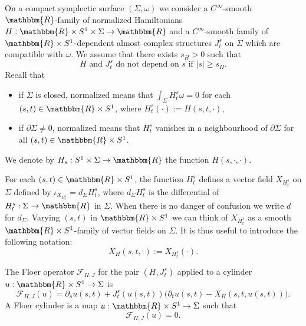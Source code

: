 \documentclass[AHL,Unicode,longabstracts,published]{cedram}
\newcommand{\R}{\mathbbm{R}}
\newcommand{\clF}{\mathcal{F}}
\begin{document}
On a compact symplectic surface $(\Sigma,\omega)$ we consider a $C^\infty$-smooth $\R$-family of normalized Hamiltonians $H:\R \times S^1 \times \Sigma \to \R$ and a $C^\infty$-smooth family of $\R \times S^1$-dependent almost complex structures $J^s_t$ on $\Sigma$ which are compatible with $\omega$. We assume that there exists $s_H>0$ such that
\begin{equation}\label{eq:Hasymp}
H \text{ and } J^s_t \text{ do not depend on } s \text{ if } |s| \geq s_H.
\end{equation}
Recall that
\begin{itemize}
\item if $\Sigma$ is closed, normalized means that $\int_\Sigma H^s_t\omega=0$ for each $(s,t) \in \R \times S^1$, where $H^s_t(\cdot):= H(s,t,\cdot)$,
\item if $\partial \Sigma \neq 0$, normalized means that $H^s_t$ vanishes in a neighbourhood of $\partial \Sigma $ for all $(s,t) \in \R \times S^1$.
\end{itemize}
We denote by $H_s:S^1 \times \Sigma \to \R$ the function $H(s,\cdot,\cdot)$.



For each $(s,t) \in \R \times S^1$, the function $ H^s_t$ defines a vector field $X_{H^s_t}$ on $\Sigma$ defined by $\iota_{X_{H^s_t}}= d_\Sigma H^s_t$, where $d_\Sigma {H^s_t}$ is the differential of $ H^s_t : \Sigma \to \R$ in $\Sigma$. When there is no danger of confusion we write $d$ for $d_\Sigma$. Varying $(s,t)$ in $\R \times S^1$ we can think of $X_{H^s_t}$ as a smooth $\R \times S^1$-family of vector fields on $\Sigma$. It is thus useful to introduce the following notation:
\[
X_H(s,t,\cdot) :=X_{H^s_t}(\cdot).
\]

The Floer operator $\clF_{H,J}$ for the pair $(H,J^s_t)$ applied to a cylinder $u: \R \times S^1 \to \Sigma$ is
\begin{equation}\label{eq:Floereq1}
\clF_{H,J}(u) = \partial_s u(s,t) + J^s_t(u(s,t))\big(\partial_t u (s,t) - X_H(s,t,u(s,t))\big).
\end{equation}
A Floer cylinder is a map $u: \R \times S^1 \to \Sigma$ such that
\begin{equation}\label{eq:Floereq2}
\clF_{H,J}(u) = 0.
\end{equation}
\end{document}
